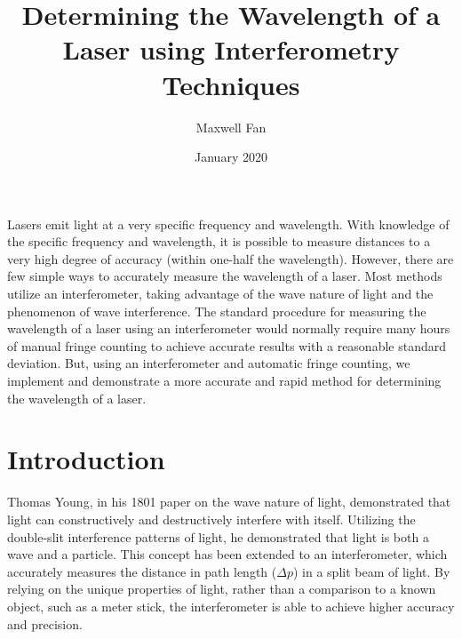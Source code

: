 \documentclass{article}
\title{Determining the Wavelength of a Laser using Interferometry Techniques}
\author{Maxwell Fan}
\date{January 2020}
\newenvironment{changemargin}[2]{%
\begin{list}{}{%
\setlength{\topsep}{0pt}%
\setlength{\leftmargin}{#1}%
\setlength{\rightmargin}{#2}%
\setlength{\listparindent}{\parindent}%
\setlength{\itemindent}{\parindent}%
\setlength{\parsep}{\parskip}%
}%
\item[]}{\end{list}}
\begin{document}
\maketitle

\section*{}

\begin{center}
        \begin{flushleft}

            Lasers emit light at a very specific frequency and wavelength. With knowledge of the specific frequency and wavelength, it is possible to measure distances to a very high degree of accuracy (within one-half the wavelength). However, there are few simple ways to accurately measure the wavelength of a laser. 
            Most methods utilize an interferometer, taking advantage of the wave nature of light and the phenomenon of wave interference. 
            The standard procedure for measuring the wavelength of a laser using an interferometer would normally require many hours of manual fringe counting to achieve accurate results with a reasonable standard deviation.
            But, using an interferometer and automatic fringe counting, we implement and demonstrate a more accurate and rapid method for determining the wavelength of a laser.

        \end{flushleft}
\end{center}

\bigskip
\bigskip

\section*{Introduction}
Thomas Young, in his 1801 paper on the wave nature of light, demonstrated that light can constructively and destructively interfere with itself. Utilizing the double-slit interference patterns  of light, he demonstrated that light is both a wave and a particle. This concept has been extended to an interferometer, which accurately measures the distance in path length ($\Delta p$) in a split beam of light. By relying on the unique properties of light, rather than a comparison to a known object, such as a meter stick, the interferometer is able to achieve higher accuracy and precision.
\end{document}

